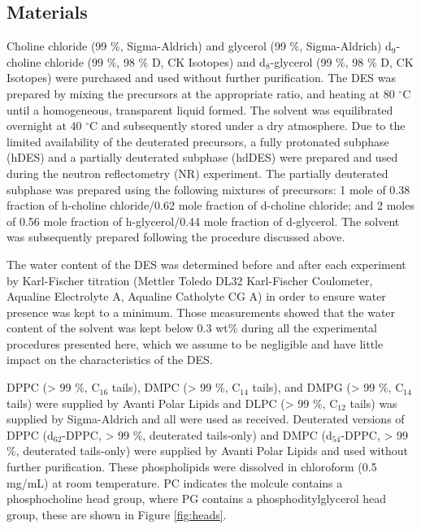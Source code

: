 \documentclass[twoside,twocolumn,9pt]{article}
\begin{document}
\subsection{Materials}
Choline chloride (99 \%, Sigma-Aldrich) and glycerol (99 \%, Sigma-Aldrich) d$_9$-choline chloride (99 \%, 98 \% D, CK Isotopes) and d$_8$-glycerol (99 \%, 98 \% D, CK Isotopes)  were purchased and used without further purification. The DES was prepared by mixing the precursors at the appropriate ratio, and heating at 80 $^\circ$C until a homogeneous, transparent liquid formed.\cite{Smith2014} The solvent was equilibrated overnight at 40 $^\circ$C and subsequently stored under a dry atmosphere. Due to the limited availability of the deuterated precursors, a fully protonated subphase (hDES) and a partially deuterated subphase (hdDES) were prepared and used during the neutron reflectometry (NR) experiment. The partially deuterated subphase was prepared using the following mixtures of precursors: 1 mole of 0.38 fraction of h-choline chloride/0.62 mole fraction of d-choline chloride; and 2 moles of 0.56 mole fraction of h-glycerol/0.44 mole fraction of d-glycerol. The solvent was subsequently prepared following the procedure discussed above. 

The water content of the DES was determined before and after each experiment by Karl-Fischer titration (Mettler Toledo DL32 Karl-Fischer Coulometer, Aqualine Electrolyte A, Aqualine Catholyte CG A) in order to ensure water presence was kept to a minimum. Those measurements showed that the water content of the solvent was kept below 0.3 wt\% during all the experimental procedures presented here, which we assume to be negligible and have little impact on the characteristics of the DES.\cite{Hammond2016,Hammond2017}

DPPC (> 99 \%, C$_{16}$ tails), DMPC (> 99 \%, C$_{14}$ tails), and DMPG (> 99 \%, C$_{14}$ tails) were supplied by Avanti Polar Lipids and DLPC (> 99 \%, C$_{12}$ tails) was supplied by Sigma-Aldrich and all were used as received. Deuterated versions of DPPC (d$_{62}$-DPPC, > 99 \%, deuterated tails-only) and DMPC (d$_{54}$-DPPC, > 99 \%, deuterated tails-only) were supplied by Avanti Polar Lipids and used without further purification. These phospholipids were dissolved in chloroform (0.5 mg/mL) at room temperature. PC indicates the molcule contains a phosphocholine head group, where PG contains a phosphoditylglycerol head group, these are shown in Figure \ref{fig:heads}.
\end{document}
